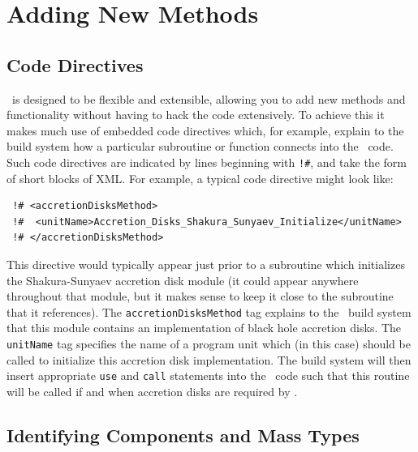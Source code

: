 \chapter{Adding New Methods}

\section{Code Directives}\label{sec:CodeDirectives}

\glc\ is designed to be flexible and extensible, allowing you to add new methods and functionality without having to hack the code extensively. To achieve this it makes much use of embedded code directives which, for example, explain to the build system how a particular subroutine or function connects into the \glc\ code. Such code directives are indicated by lines beginning with {\tt !\#}, and take the form of short blocks of XML. For example, a typical code directive might look like:
\begin{verbatim}
 !# <accretionDisksMethod>
 !#  <unitName>Accretion_Disks_Shakura_Sunyaev_Initialize</unitName>
 !# </accretionDisksMethod>
\end{verbatim}
This directive would typically appear just prior to a subroutine which initializes the Shakura-Sunyaev accretion disk module (it could appear anywhere throughout that module, but it makes sense to keep it close to the subroutine that it references). The {\tt accretionDisksMethod} tag explains to the \glc\ build system that this module contains an implementation of black hole accretion disks. The {\tt unitName} tag specifies the name of a program unit which (in this case) should be called to initialize this accretion disk implementation. The build system will then insert appropriate {\tt use} and {\tt call} statements into the \glc\ code such that this routine will be called if and when accretion disks are required by \glc.

\section{Identifying Components and Mass Types}\label{sec:ComponentMassTypes}

